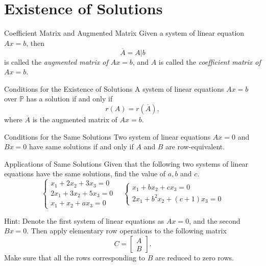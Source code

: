 
\section{Existence of Solutions}

\begin{definition}{Coefficient Matrix and Augmented Matrix}{}
  Given a system of linear equation $Ax = b$, then
  \begin{equation}
    \overline{A} = A | b
  \end{equation}
  is called the \emph{augmented matrix of $Ax = b$},
  and $A$ is called the \emph{coefficient matrix of $Ax = b$}.
\end{definition}

\begin{proposition}{Conditions for the Existence of Solutions}{}
  A system of linear equations $Ax = b$ over $\mathbb{P}$ has a solution
  if and only if 
  \begin{equation}
    r(A) = r(\overline{A}),
  \end{equation}
  where $\overline{A}$ is the augmented matrix of $Ax = b$.
\end{proposition}

\begin{proposition}{Conditions for the Same Solutions}{}
  Two system of linear equations $Ax = 0$ and $Bx = 0$ have same solutions
  if and only if $A$ and $B$ are row-equivalent.
\end{proposition}

\begin{example}{Applications of Same Solutions}{}
  Given that the following two systems of linear equations have the same
  solutions, find the value of $a,b$ and $c$.
  \begin{equation}
    \begin{cases}
      x_1 + 2x_2 + 3x_3 = 0\\
      2x_1 + 3x_2 + 5x_3=0\\
      x_1 + x_2 + ax_3 = 0
    \end{cases}
    \quad
    \begin{cases}
      x_1 + bx_2 + cx_3 = 0\\
      2x_1 + b^2x_2 + (c+1)x_3 = 0
    \end{cases}
  \end{equation}
\end{example}

\begin{solution}
  Hint: Denote the first system of linear equations as $Ax = 0$, and the second
  $Bx = 0$. Then apply elementary row operations to the following matrix
  \begin{equation}
    C =
    \begin{bmatrix}
      A\\
      B
    \end{bmatrix}.
  \end{equation}
  Make sure that all the rows corresponding to $B$ are reduced to zero rows.
\end{solution}


